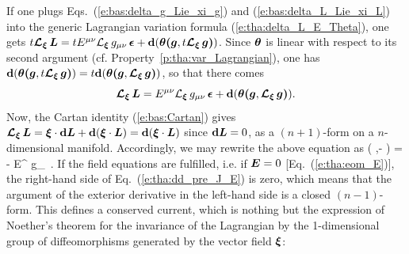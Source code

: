 If one plugs Eqs.~(\ref{e:bas:delta_g_Lie_xi_g}) and (\ref{e:bas:delta_L_Lie_xi_L})
into the generic Lagrangian variation formula (\ref{e:tha:delta_L_E_Theta}), one gets
$t \bm{\mathcal{L}}_{\bm{\xi}}\, \bm{L}  = t E^{\mu\nu} {\mathcal{L}}_{\bm{\xi}}\, g_{\mu\nu} \,\bm{\epsilon} + \mathbf{d}( \bm{\theta}\textbf{(}\bm{g},t\bm{\mathcal{L}}_{\bm{\xi}}\,\bm{g}\textbf{)})$.
Since $\bm{\theta}$ is linear with respect to its second argument (cf. Property~\ref{p:tha:var_Lagrangian}),
one has
$\mathbf{d}( \bm{\theta}\textbf{(}\bm{g},t\bm{\mathcal{L}}_{\bm{\xi}}\,\bm{g}\textbf{)}) =  t \mathbf{d}( \bm{\theta}\textbf{(}\bm{g},\bm{\mathcal{L}}_{\bm{\xi}}\,\bm{g}\textbf{)})$, so that there comes
\[
    \bm{\mathcal{L}}_{\bm{\xi}}\, \bm{L}  = E^{\mu\nu} {\mathcal{L}}_{\bm{\xi}}\, g_{\mu\nu} \,\bm{\epsilon} + \mathbf{d}( \bm{\theta}\textbf{(}\bm{g},\bm{\mathcal{L}}_{\bm{\xi}}\,\bm{g}\textbf{)}) .
\]
Now, the Cartan identity (\ref{e:bas:Cartan}) gives
$\bm{\mathcal{L}}_{\bm{\xi}}\, \bm{L} = \bm{\xi} \cdot\mathbf{d} \bm{L} + \mathbf{d}(\bm{\xi}\cdot\bm{L}) = \mathbf{d}(\bm{\xi}\cdot\bm{L})$
since $\mathbf{d} \bm{L} = 0$, as a $(n+1)$-form on a $n$-dimensional manifold.
Accordingly, we may rewrite the above equation as
\be \label{e:tha:dd_pre_J_E}
    \dd\left(  \w{\theta}\lld{},\Lie{\xi}\rld - \w{\xi}\cdot{} \right) =
    - E^{\mu\nu} \Liec{\xi} g_{\mu\nu} \,\weps .
\ee
If the field equations are fulfilled, i.e. if $\bm{E} = 0$ [Eq.~(\ref{e:tha:eom_E})], the
right-hand side of Eq.~(\ref{e:tha:dd_pre_J_E}) is zero, which means that the
argument of the exterior derivative in the left-hand side is a closed
$(n-1)$-form. This defines a conserved current, which is nothing but the expression
of Noether's theorem for the invariance of the Lagrangian by the 1-dimensional
group of diffeomorphisms generated by the vector field $\bm{\xi}$:

